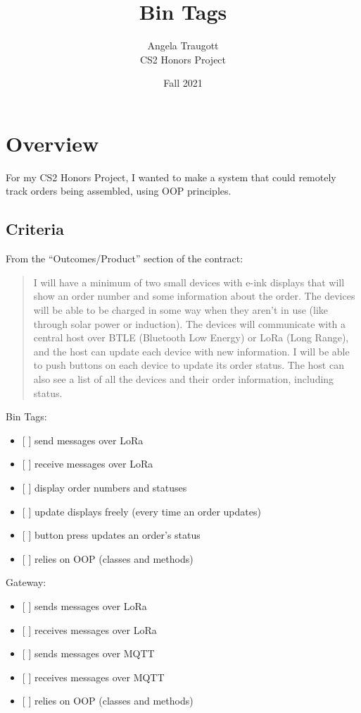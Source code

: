 \documentclass{article}
\title{Bin Tags}
\author{Angela Traugott\\CS2 Honors Project}
\date{Fall 2021}
\begin{document}
\maketitle

\section{Overview}\label{overview}

For my CS2 Honors Project, I wanted to make a system that could remotely
track orders being assembled, using OOP principles.~

\subsection{Criteria}\label{criteria}

From the ``Outcomes/Product'' section of the contract:~

\begin{quote}
I will have a minimum of two small devices with e-ink displays that will
show an order number and some information about the order. The devices
will be able to be charged in some way when they aren't in use (like
through solar power or induction). The devices will communicate with a
central host over BTLE (Bluetooth Low Energy) or LoRa (Long Range), and
the host can update each device with new information. I will be able to
push buttons on each device to update its order status. The host can
also see a list of all the devices and their order information,
including status.
\end{quote}

\noindent
Bin Tags:

\begin{itemize}
\item
  {[} {]} send messages over LoRa
\item
  {[} {]} receive messages over LoRa
\item
  {[} {]} display order numbers and statuses
\item
  {[} {]} update displays freely (every time an order updates)
\item
  {[} {]} button press updates an order's status
\item
  {[} {]} relies on OOP (classes and methods)
\end{itemize}

\noindent
Gateway:

\begin{itemize}
\item
  {[} {]} sends messages over LoRa
\item
  {[} {]} receives messages over LoRa
\item
  {[} {]} sends messages over MQTT
\item
  {[} {]} receives messages over MQTT
\item
  {[} {]} relies on OOP (classes and methods)
\end{itemize}
\end{document}
